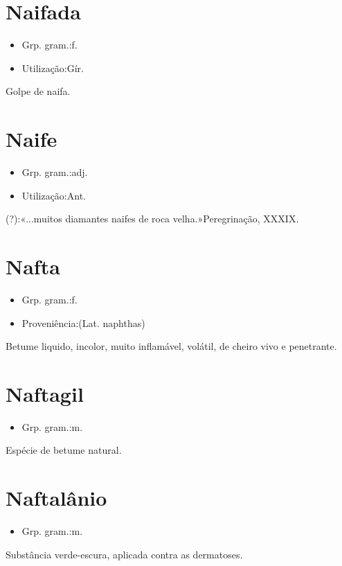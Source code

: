 \section{Naifada}
\begin{itemize}
\item {Grp. gram.:f.}
\end{itemize}
\begin{itemize}
\item {Utilização:Gír.}
\end{itemize}
Golpe de naifa.
\section{Naife}
\begin{itemize}
\item {Grp. gram.:adj.}
\end{itemize}
\begin{itemize}
\item {Utilização:Ant.}
\end{itemize}
(?):«\textunderscore ...muitos diamantes naifes de roca velha.\textunderscore »\textunderscore Peregrinação\textunderscore , XXXIX.
\section{Nafta}
\begin{itemize}
\item {Grp. gram.:f.}
\end{itemize}
\begin{itemize}
\item {Proveniência:(Lat. \textunderscore naphthas\textunderscore )}
\end{itemize}
Betume liquido, incolor, muito inflamável, volátil, de cheiro vivo e penetrante.
\section{Naftagil}
\begin{itemize}
\item {Grp. gram.:m.}
\end{itemize}
Espécie de betume natural.
\section{Naftalânio}
\begin{itemize}
\item {Grp. gram.:m.}
\end{itemize}
Substância verde-escura, aplicada contra as dermatoses.

